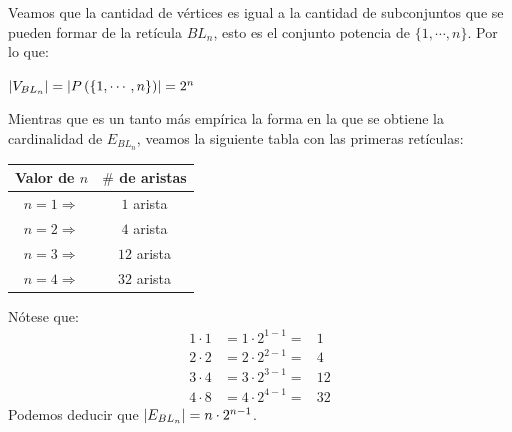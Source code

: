 \documentclass{article}
\begin{document}
\begin{enumerate}
\begin{enumerate}
    Veamos que la cantidad de v\'ertices es igual a la
    cantidad de subconjuntos que se pueden formar de
    la ret\'icula $BL_n$, esto es el conjunto potencia
    de $\{1, \dotsm, n\}$. Por lo que:
    \begin{center}
      $\abs{V_{BL_n}} = \abs{P \left(\{1, \dotsm, n\}\right)} = 2^{n}$
    \end{center}
    Mientras que es un tanto m\'as emp\'irica la forma en
    la que se obtiene la cardinalidad de $E_{BL_n}$,
    veamos la siguiente tabla con las primeras ret\'iculas:
    \begin{center}
      \begin{tabular}{|c|c|}
        \hline
        Valor de $n$ & $\#$ de aristas \\
        \hline
        $n = 1 \Rightarrow$ & $1$ arista \\
        \hline
        $n = 2 \Rightarrow$ & $4$ arista \\
        \hline
        $n = 3 \Rightarrow$ & $12$ arista \\
        \hline
        $n = 4 \Rightarrow$ & $32$ arista \\
        \hline
      \end{tabular}
    \end{center}
    N\'otese que:
    \begin{eqnarray*}
      1 \cdot 1 &= 1 \cdot 2^{1-1} =& 1\\
      2 \cdot 2 &= 2 \cdot 2^{2-1} =& 4\\
      3 \cdot 4 &= 3 \cdot 2^{3-1} =& 12\\
      4 \cdot 8 &= 4 \cdot 2^{4-1} =& 32
    \end{eqnarray*}
    Podemos deducir que $\abs{E_{BL_n}} = n \cdot 2^{n-1}$.

    \begin{center}
    \end{center}


\end{enumerate}
\end{enumerate}
\end{document}
